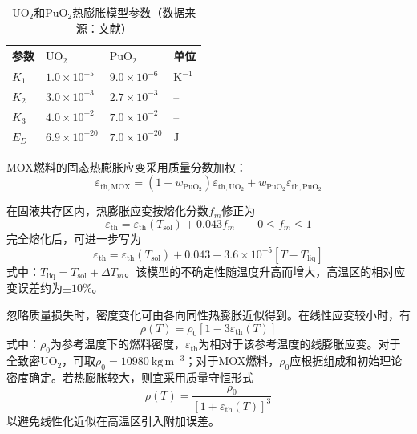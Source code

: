 \begin{table}[htbp]
	\centering
	\caption{$\mathrm{UO}_2$和$\mathrm{PuO}_2$热膨胀模型参数（数据来源：文献\cite{hagrmanSCDAPRELAP5MOD1995}）}
	\label{tab:mox_thermal_expansion_parameters}
	\begin{tabularx}{\textwidth}{
			>{\centering\arraybackslash}p{}
			>{\centering\arraybackslash}X
			>{\centering\arraybackslash}X
			>{\centering\arraybackslash}p{}
		}
		\toprule
		参数 & $\mathrm{UO}_2$ & $\mathrm{PuO}_2$ & 单位 \\
		\midrule
		$K_1$ & $1.0\times10^{-5}$  & $9.0\times10^{-6}$  & $\mathrm{K^{-1}}$ \\
		$K_2$ & $3.0\times10^{-3}$  & $2.7\times10^{-3}$  & -- \\
		$K_3$ & $4.0\times10^{-2}$  & $7.0\times10^{-2}$  & -- \\
		$E_D$ & $6.9\times10^{-20}$ & $7.0\times10^{-20}$ & $\mathrm{J}$ \\
		\bottomrule
	\end{tabularx}
\end{table}

MOX燃料的固态热膨胀应变采用质量分数加权：
\begin{equation}
	\varepsilon_{\mathrm{th},\mathrm{MOX}}
	=(1-w_{\mathrm{PuO}_2})\varepsilon_{\mathrm{th},\mathrm{UO}_2}
	+w_{\mathrm{PuO}_2}\varepsilon_{\mathrm{th},\mathrm{PuO}_2}
	\label{eq:mox_solid_thermal_expansion}
\end{equation}

在固液共存区内，热膨胀应变按熔化分数$f_m$修正为
\begin{equation}
	\varepsilon_{\mathrm{th}}
	=\varepsilon_{\mathrm{th}}(T_{\mathrm{sol}})+0.043f_m
	\qquad 0\leq f_m\leq1
	\label{eq:mox_partial_melting_expansion}
\end{equation}
完全熔化后，可进一步写为
\begin{equation}
	\varepsilon_{\mathrm{th}}
	=\varepsilon_{\mathrm{th}}(T_{\mathrm{sol}})+0.043
	+3.6\times10^{-5}\left[T-T_{\mathrm{liq}}\right]
	\label{eq:mox_liquid_expansion}
\end{equation}
式中：$T_{\mathrm{liq}}=T_{\mathrm{sol}}+\Delta T_m$。该模型的不确定性随温度升高而增大，高温区的相对应变误差约为$\pm10\%$。


忽略质量损失时，密度变化可由各向同性热膨胀近似得到。在线性应变较小时，有
\begin{equation}
	\rho(T)=\rho_0\left[1-3\varepsilon_{\mathrm{th}}(T)\right]
	\label{eq:mox_density_linearized}
\end{equation}
式中：$\rho_0$为参考温度下的燃料密度，$\varepsilon_{\mathrm{th}}$为相对于该参考温度的线膨胀应变。对于全致密$\mathrm{UO}_2$，可取$\rho_0=10980\ \mathrm{kg\,m^{-3}}$；对于MOX燃料，$\rho_0$应根据组成和初始理论密度确定。若热膨胀较大，则宜采用质量守恒形式
\begin{equation}
	\rho(T)=\frac{\rho_0}{\left[1+\varepsilon_{\mathrm{th}}(T)\right]^3}
	\label{eq:mox_density_exact}
\end{equation}
以避免线性化近似在高温区引入附加误差。

